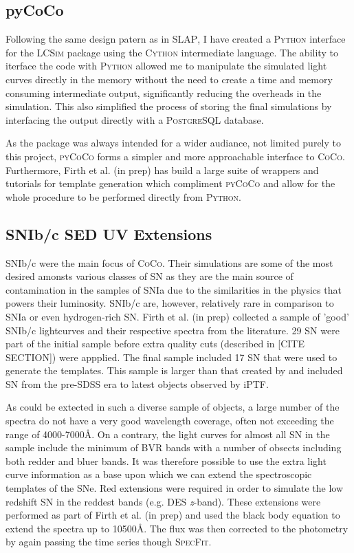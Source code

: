 \subsection{pyCoCo}
Following the same design patern as in \textsc{SLAP}, I have created a \textsc{Python} interface for the \textsc{LCSim} package using the \textsc{Cython} intermediate language. The ability to iterface the code with \textsc{Python} allowed me to manipulate the simulated light curves directly in the memory without the need to create a time and memory consuming intermediate output, significantly reducing the overheads in the simulation. This also simplified the process of storing the final simulations by interfacing the output directly with a \textsc{PostgreSQL} database.

As the package was always intended for a wider audiance, not limited purely to this project, \textsc{pyCoCo} forms a simpler and more approachable interface to \textsc{CoCo}. Furthermore, Firth et al. (in prep) has build a large suite of wrappers and tutorials for template generation which compliment \textsc{pyCoCo} and allow for the whole procedure to be performed directly from \textsc{Python}.

\subsection{SNIb/c SED UV Extensions}
SNIb/c were the main focus of \textsc{CoCo}. Their simulations are some of the most desired amonsts various classes of SN as they are the main source of contamination in the samples of SNIa due to the similarities in the physics that powers their luminosity. SNIb/c are, however, relatively rare in comparison to SNIa or even hydrogen-rich SN.   Firth et al. (in prep) collected a sample of 'good' SNIb/c lightcurves and their respective spectra from the literature. 29 SN were part of the initial sample before extra quality cuts (described in [CITE SECTION]) were appplied. The final sample included 17 SN that were used to generate the templates. This sample is larger than that created by \citet{Kessler2010} and included SN from the pre-SDSS era to latest objects observed by iPTF.

As could be extected in such a diverse sample of objects, a large number of the spectra do not have a very good wavelength coverage, often not exceeding the range of 4000-7000\AA. On a contrary, the light curves for almost all SN in the sample include the minimum of BVR bands with a number of obsects including both redder and bluer bands. It was therefore possible to use the extra light curve information as a base upon which we can extend the spectroscopic templates of the SNe. Red extensions were required in order to simulate the low redshift SN in the reddest bands (e.g. DES \textit{z}-band). These extensions were performed as part of Firth et al. (in prep) and used the black body equation to extend the spectra up to 10500\AA. The flux was then corrected to the photometry by again passing the time series though \textsc{SpecFit}.

